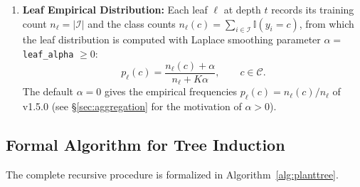 \documentclass[11pt,a4paper]{article}
\newcommand{\code}[1]{\texttt{#1}}
\newcommand{\Ind}{\mathbb{I}}
\begin{document}
\begin{enumerate}[leftmargin=*, itemsep=4pt]
  \item \textbf{Leaf Empirical Distribution:} Each leaf $\ell$ at depth $t$ records its training count $n_{\ell} = |\mathcal{I}|$ and the class counts $n_{\ell}(c) = \sum_{i \in \mathcal{I}} \Ind(y_i = c)$, from which the leaf distribution is computed with Laplace smoothing parameter $\alpha = {}$\code{leaf\_alpha} $\ge 0$:
  \begin{equation}
    p_{\ell}(c) = \frac{n_{\ell}(c) + \alpha}{n_{\ell} + K\alpha},
    \qquad c \in \mathcal{C}.
  \end{equation}
  The default $\alpha = 0$ gives the empirical frequencies $p_{\ell}(c) = n_{\ell}(c)/n_{\ell}$ of v1.5.0 (see \S\ref{sec:aggregation} for the motivation of $\alpha > 0$).
\end{enumerate}

\subsection{Formal Algorithm for Tree Induction}

The complete recursive procedure is formalized in Algorithm~\ref{alg:planttree}.
\end{document}
